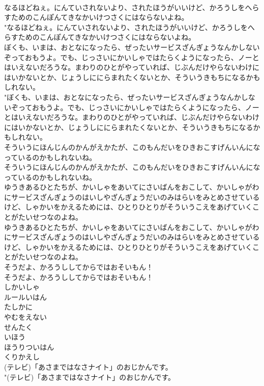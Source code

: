 \documentclass[8pt]{extreport}
\begin{document}
\begin{CJK}{UTF8}{min}
\\	なるほどねぇ。にんていされないより、されたほうがいいけど、かろうしをへらすためのこんぽんてきなかいけつさくにはならないよね。	
\\	"なるほどねぇ。にんていされないより、されたほうがいいけど、かろうしをへらすためのこんぽんてきなかいけつさくにはならないよね。 
\\	ぼくも、いまは、おとなになったら、ぜったいサービスざんぎょうなんかしないぞっておもうよ。でも、じっさいにかいしゃではたらくようになったら、ノーとはいえないだろうな。まわりのひとがやっていれば、じぶんだけやらないわけにはいかないとか、じょうしににらまれたくないとか、そういうきもちになるかもしれない。	
\\	"ぼくも、いまは、おとなになったら、ぜったいサービスざんぎょうなんかしないぞっておもうよ。でも、じっさいにかいしゃではたらくようになったら、ノーとはいえないだろうな。まわりのひとがやっていれば、じぶんだけやらないわけにはいかないとか、じょうしににらまれたくないとか、そういうきもちになるかもしれない。 
\\	そういうにほんじんのかんがえかたが、このもんだいをひきおこすげんいんになっているのかもしれないね。	
\\	そういうにほんじんのかんがえかたが、このもんだいをひきおこすげんいんになっているのかもしれないね。 
\\	ゆうきあるひとたちが、かいしゃをあいてにさいばんをおこして、かいしゃがわにサービスざんぎょうのはいしやざんぎょうだいのみはらいをみとめさせているけど、しゃかいをかえるためには、ひとりひとりがそういうこえをあげていくことがたいせつなのよね。	
\\	ゆうきあるひとたちが、かいしゃをあいてにさいばんをおこして、かいしゃがわにサービスざんぎょうのはいしやざんぎょうだいのみはらいをみとめさせているけど、しゃかいをかえるためには、ひとりひとりがそういうこえをあげていくことがたいせつなのよね。 
\\	そうだよ、かろうししてからではおそいもん！	
\\	そうだよ、かろうししてからではおそいもん！ 
\\	しかいしゃ
\\	ルールいはん
\\	たしかに
\\	やむをえない
\\	せんたく
\\	いほう
\\	ほうりついはん
\\	くりかえし
\\	(テレビ)「あさまではなさナイト」のおじかんです。	
\\	"(テレビ)「あさまではなさナイト」のおじかんです。 

\end{CJK}
\end{document}
